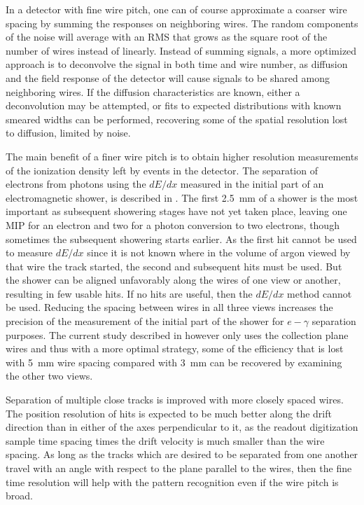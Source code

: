 In a detector with fine wire pitch,
one can of course approximate a coarser wire spacing by summing the responses on neighboring
wires.  The random components of the noise will
average with an RMS that grows as the square root of the number of wires instead of linearly.
Instead of summing signals, a more optimized approach is to deconvolve the signal in both
time and wire number, as diffusion and the field response of the detector will cause
signals to be shared among neighboring wires.  If the diffusion characteristics are known,
either a deconvolution may be attempted, or fits to expected distributions with known
smeared widths can be performed, recovering some of the spatial resolution lost to diffusion,
limited by noise.

The main benefit of a finer wire pitch is to obtain higher resolution measurements of the
ionization density left by events in the detector.  The separation of electrons from
photons using the $dE/dx$ measured in the initial part of an electromagnetic shower, is
described in \anxreco.  The first 2.5~mm of a shower is the most important as subsequent
showering stages have not yet taken place, leaving one MIP for an electron and two for a photon
conversion to two electrons, though sometimes the subsequent showering starts earlier.
As the first hit cannot be used to measure $dE/dx$ since it is not known where in the volume
of argon viewed by that wire the track started, the second and subsequent hits must be used.
But the shower can be aligned unfavorably along the wires of one view or another, resulting
in few usable hits.  If no hits are useful, then the $dE/dx$ method cannot be used.  Reducing
the spacing between wires in all three views increases the precision of the measurement of the
initial part of the shower for $e-\gamma$ separation purposes.  The current study described
in \anxreco however only uses the collection plane wires and thus with a more optimal strategy,
some of the efficiency that is lost with 5~mm wire spacing compared with 3~mm can be recovered
by examining the other two views.

Separation of multiple close tracks
is improved with more closely spaced wires.  The position resolution of hits
is expected to be much better along the drift direction than in either of the axes perpendicular
to it, as the readout digitization sample time spacing times the drift velocity is much smaller
than the wire spacing.  As long as the tracks which are desired to be separated from one another
travel with an angle with respect to the plane parallel to the wires, then the fine time resolution
will help with the pattern recognition even if the wire pitch is broad.

